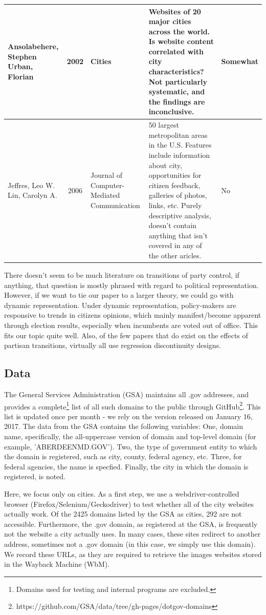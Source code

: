 \documentclass[11pt]{article}
\begin{document}
\begin{landscape}
\begin{table}[htbp]
\begin{tabular}{|p{2cm}|c|p{3cm}|p{12cm}|l|}
			Ansolabehere, Stephen
			Urban, Florian & 2002 & Cities & Websites of 20 major cities across the world. Is website content correlated with city characteristics? Not particularly systematic, and the findings are inconclusive. & Somewhat \\ \hline
			Jeffres, Leo W.
			Lin, Carolyn A. & 2006 & Journal of Computer-Mediated Communication & 50 largest metropolitan areas in the U.S. Features include information about city, opportunities for citizen feedback, galleries of photos, links, etc.  Purely descriptive analysis, doesn't contain anything that isn't covered in any of the other aricles. & No \\ \hline
		\end{tabular}
		\label{}
	\end{table}
\end{landscape}

There doesn't seem to be much literature on transitions of party control, if anything, that question is mostly phrased with regard to political representation. However, if we want to tie our paper to a larger theory, we could go with dynamic representation. Under dynamic representation, policy-makers are responsive to trends in citizens opinions, which mainly manifest/become apparent through election results, especially when incumbents are voted out of office. This fits our topic quite well. Also, of the few papers that do exist on the effects of partisan transitions, virtually all use regression discontinuity designs.


\subsection{Data}
The General Services Administration (GSA) maintains all .gov addresses, and provides a complete\footnote{Domains used for testing and internal programs are excluded.} list of all such domains to the public through GitHub\footnote{https://github.com/GSA/data/tree/gh-pages/dotgov-domains}. This list is updated once per month - we rely on the version released on January 16, 2017. The data from the GSA contains the following variables: One, domain name, specifically, the all-uppercase version of domain and top-level domain (for example, 'ABERDEENMD.GOV'). Two, the type of government entity to which the domain is registered, such as city, county, federal agency, etc. Three, for federal agencies, the name is specfied. Finally, the city in which the domain is registered, is noted.

Here, we focus only on cities. As a first step, we use a webdriver-controlled browser (Firefox/Selenium/Geckodriver) to test whether all of the city websites actually work. Of the 2425 domains listed by the GSA as cities, 292 are not accessible. Furthermore, the .gov domain, as registered at the GSA, is frequently not the website a city actually uses. In many cases, these sites redirect to another address, sometimes not a .gov domain (in this case, we simply use this domain). We record these URLs, as they are required to retrieve the images websites stored in the Wayback Machine (WbM).
\end{document}
